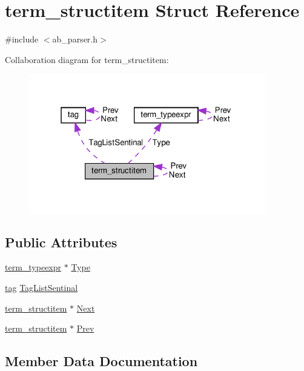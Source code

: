 \hypertarget{structterm__structitem}{}\section{term\+\_\+structitem Struct Reference}
\label{structterm__structitem}


{\ttfamily \#include $<$ab\+\_\+parser.\+h$>$}



Collaboration diagram for term\+\_\+structitem\+:
\nopagebreak
\begin{figure}[H]
\begin{center}
\leavevmode
\includegraphics[width=292pt]{df/d30/structterm__structitem__coll__graph}
\end{center}
\end{figure}
\subsection*{Public Attributes}
\begin{DoxyCompactItemize}
\item 
\hyperlink{structterm__typeexpr}{term\+\_\+typeexpr} $\ast$ \hyperlink{structterm__structitem_ac2a7c2261f1714cedb33376eb440e66c}{Type}
\item 
\hyperlink{structtag}{tag} \hyperlink{structterm__structitem_a25c03f6130b24c035dadd65fbe5f0110}{Tag\+List\+Sentinal}
\item 
\hyperlink{structterm__structitem}{term\+\_\+structitem} $\ast$ \hyperlink{structterm__structitem_a92becd37fab5b7e4b326e3111c6a7c40}{Next}
\item 
\hyperlink{structterm__structitem}{term\+\_\+structitem} $\ast$ \hyperlink{structterm__structitem_a724d81ad66a76f54b153a97a8b175b7d}{Prev}
\end{DoxyCompactItemize}


\subsection{Member Data Documentation}
\mbox{\label{structterm__structitem_a92becd37fab5b7e4b326e3111c6a7c40}} 
